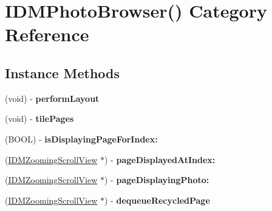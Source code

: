 \hypertarget{category_i_d_m_photo_browser_07_08}{}\section{I\+D\+M\+Photo\+Browser() Category Reference}
\label{category_i_d_m_photo_browser_07_08}
\subsection*{Instance Methods}
\begin{DoxyCompactItemize}
\item 
\hypertarget{category_i_d_m_photo_browser_07_08_a7116e3069dbb5c58480de9bd9d8a3950}{}(void) -\/ {\bfseries perform\+Layout}\label{category_i_d_m_photo_browser_07_08_a7116e3069dbb5c58480de9bd9d8a3950}

\item 
\hypertarget{category_i_d_m_photo_browser_07_08_a818ef93b96bae7e998792f979353418c}{}(void) -\/ {\bfseries tile\+Pages}\label{category_i_d_m_photo_browser_07_08_a818ef93b96bae7e998792f979353418c}

\item 
\hypertarget{category_i_d_m_photo_browser_07_08_a5802b738ef167db4ad9ee6b74619eb9b}{}(B\+O\+O\+L) -\/ {\bfseries is\+Displaying\+Page\+For\+Index\+:}\label{category_i_d_m_photo_browser_07_08_a5802b738ef167db4ad9ee6b74619eb9b}

\item 
\hypertarget{category_i_d_m_photo_browser_07_08_a52c6f52c91ebcb854c1f81e913357764}{}(\hyperlink{interface_i_d_m_zooming_scroll_view}{I\+D\+M\+Zooming\+Scroll\+View} $\ast$) -\/ {\bfseries page\+Displayed\+At\+Index\+:}\label{category_i_d_m_photo_browser_07_08_a52c6f52c91ebcb854c1f81e913357764}

\item 
\hypertarget{category_i_d_m_photo_browser_07_08_a4760c8e1863304b393f6c701be3362f8}{}(\hyperlink{interface_i_d_m_zooming_scroll_view}{I\+D\+M\+Zooming\+Scroll\+View} $\ast$) -\/ {\bfseries page\+Displaying\+Photo\+:}\label{category_i_d_m_photo_browser_07_08_a4760c8e1863304b393f6c701be3362f8}

\item 
\hypertarget{category_i_d_m_photo_browser_07_08_a02c5de9ff79cd5ef6c2483ef372dacc5}{}(\hyperlink{interface_i_d_m_zooming_scroll_view}{I\+D\+M\+Zooming\+Scroll\+View} $\ast$) -\/ {\bfseries dequeue\+Recycled\+Page}\label{category_i_d_m_photo_browser_07_08_a02c5de9ff79cd5ef6c2483ef372dacc5}


\end{DoxyCompactItemize}
